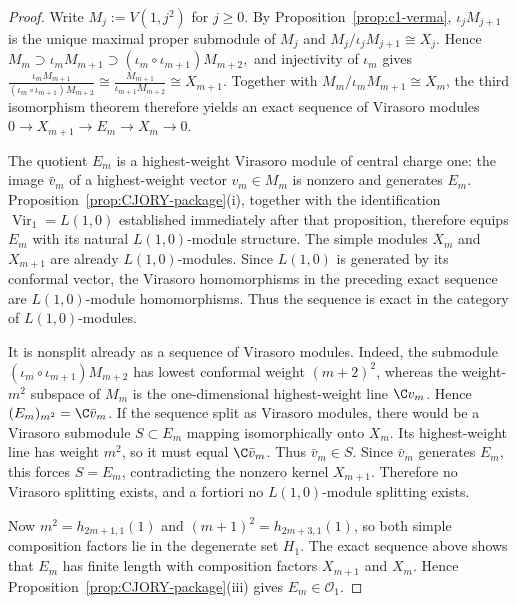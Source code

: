 \documentclass[12pt,leqno]{amsart}
\numberwithin{equation}{section} \newtheorem{thm}{Theorem}[section] \newtheorem{lem}[thm]{Lemma} \newtheorem{ex}[thm]{Example} \newtheorem{prop}[thm]{Proposition} \newtheorem{cor}[thm]{Corollary} \newtheorem{defi}[thm]{Definition} \newtheorem{rmk}[thm]{Remark} \newtheorem{notation}[thm]{Notation}
\newcommand{\Vir}{\operatorname{Vir}}
\newcommand{\Ovir}{\mathcal O_1}
\begin{document}
\begin{proof}
Write $M_j:=V(1,j^2)$ for $j\ge0$. By Proposition~\ref{prop:c1-verma}, $\iota_jM_{j+1}$ is the unique maximal proper submodule of $M_j$ and \(M_j/\iota_jM_{j+1}\cong X_j\). Hence \(M_m\supset \iota_mM_{m+1} \supset (\iota_m\circ\iota_{m+1})M_{m+2},\) and injectivity of $\iota_m$ gives \(\frac{\iota_mM_{m+1}} {(\iota_m\circ\iota_{m+1})M_{m+2}} \cong \frac{M_{m+1}}{\iota_{m+1}M_{m+2}} \cong X_{m+1}\). Together with \(M_m/\iota_mM_{m+1}\cong X_m\), the third isomorphism theorem therefore yields an exact sequence of Virasoro modules \(0\longrightarrow X_{m+1}\longrightarrow E_m \longrightarrow X_m\longrightarrow0.\)

The quotient $E_m$ is a highest-weight Virasoro module of central charge one: the image $\bar v_m$ of a highest-weight vector $v_m\in M_m$ is nonzero and generates $E_m$. Proposition~\ref{prop:CJORY-package}(i), together with the identification $\Vir_1=L(1,0)$ established immediately after that proposition, therefore equips $E_m$ with its natural $L(1,0)$-module structure. The simple modules $X_m$ and $X_{m+1}$ are already $L(1,0)$-modules. Since $L(1,0)$ is generated by its conformal vector, the Virasoro homomorphisms in the preceding exact sequence are $L(1,0)$-module homomorphisms. Thus the sequence is exact in the category of $L(1,0)$-modules.

It is nonsplit already as a sequence of Virasoro modules. Indeed, the submodule $(\iota_m\circ\iota_{m+1})M_{m+2}$ has lowest conformal weight $(m+2)^2$, whereas the weight-$m^2$ subspace of $M_m$ is the one-dimensional highest-weight line $\C v_m$. Hence \((E_m)_{m^2}=\C\bar v_m\). If the sequence split as Virasoro modules, there would be a Virasoro submodule $S\subset E_m$ mapping isomorphically onto $X_m$. Its highest-weight line has weight $m^2$, so it must equal $\C\bar v_m$. Thus $\bar v_m\in S$. Since $\bar v_m$ generates $E_m$, this forces $S=E_m$, contradicting the nonzero kernel $X_{m+1}$. Therefore no Virasoro splitting exists, and a fortiori no $L(1,0)$-module splitting exists.

Now \(m^2=h_{2m+1,1}(1)\) and \((m+1)^2=h_{2m+3,1}(1)\), so both simple composition factors lie in the degenerate set $H_1$. The exact sequence above shows that $E_m$ has finite length with composition factors $X_{m+1}$ and $X_m$. Hence Proposition~\ref{prop:CJORY-package}(iii) gives $E_m\in\Ovir$.


\end{proof}
\end{document}
